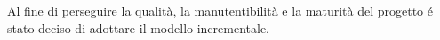 Al fine di perseguire la qualità, la manutentibilità e la maturità del progetto
\'e stato deciso di adottare il modello incrementale.